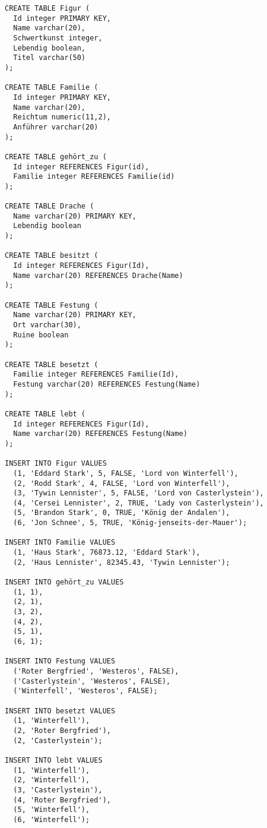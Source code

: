 \documentclass{lehramt-informatik-aufgabe}
\begin{document}
\begin{verbatim}
CREATE TABLE Figur (
  Id integer PRIMARY KEY,
  Name varchar(20),
  Schwertkunst integer,
  Lebendig boolean,
  Titel varchar(50)
);

CREATE TABLE Familie (
  Id integer PRIMARY KEY,
  Name varchar(20),
  Reichtum numeric(11,2),
  Anführer varchar(20)
);

CREATE TABLE gehört_zu (
  Id integer REFERENCES Figur(id),
  Familie integer REFERENCES Familie(id)
);

CREATE TABLE Drache (
  Name varchar(20) PRIMARY KEY,
  Lebendig boolean
);

CREATE TABLE besitzt (
  Id integer REFERENCES Figur(Id),
  Name varchar(20) REFERENCES Drache(Name)
);

CREATE TABLE Festung (
  Name varchar(20) PRIMARY KEY,
  Ort varchar(30),
  Ruine boolean
);

CREATE TABLE besetzt (
  Familie integer REFERENCES Familie(Id),
  Festung varchar(20) REFERENCES Festung(Name)
);

CREATE TABLE lebt (
  Id integer REFERENCES Figur(Id),
  Name varchar(20) REFERENCES Festung(Name)
);

INSERT INTO Figur VALUES
  (1, 'Eddard Stark', 5, FALSE, 'Lord von Winterfell'),
  (2, 'Rodd Stark', 4, FALSE, 'Lord von Winterfell'),
  (3, 'Tywin Lennister', 5, FALSE, 'Lord von Casterlystein'),
  (4, 'Cersei Lennister', 2, TRUE, 'Lady von Casterlystein'),
  (5, 'Brandon Stark', 0, TRUE, 'König der Andalen'),
  (6, 'Jon Schnee', 5, TRUE, 'König-jenseits-der-Mauer');

INSERT INTO Familie VALUES
  (1, 'Haus Stark', 76873.12, 'Eddard Stark'),
  (2, 'Haus Lennister', 82345.43, 'Tywin Lennister');

INSERT INTO gehört_zu VALUES
  (1, 1),
  (2, 1),
  (3, 2),
  (4, 2),
  (5, 1),
  (6, 1);

INSERT INTO Festung VALUES
  ('Roter Bergfried', 'Westeros', FALSE),
  ('Casterlystein', 'Westeros', FALSE),
  ('Winterfell', 'Westeros', FALSE);

INSERT INTO besetzt VALUES
  (1, 'Winterfell'),
  (2, 'Roter Bergfried'),
  (2, 'Casterlystein');

INSERT INTO lebt VALUES
  (1, 'Winterfell'),
  (2, 'Winterfell'),
  (3, 'Casterlystein'),
  (4, 'Roter Bergfried'),
  (5, 'Winterfell'),
  (6, 'Winterfell');
\end{verbatim}
\end{document}
